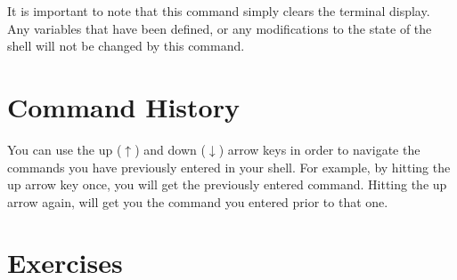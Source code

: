 It is important to note that this command simply clears the terminal display. Any variables that have been defined, or any modifications to the state of the shell will not be changed by this command.

\section{Command History}

You can use the up ($\uparrow$) and down ($\downarrow$) arrow keys in order to navigate the commands you have previously entered in your shell. For example, by hitting the up arrow key once, you will get the previously entered command. Hitting the up arrow again, will get you the command you entered prior to that one.

\section*{Exercises}

